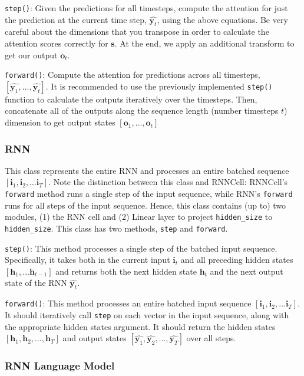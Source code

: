 \documentclass[11pt,addpoints,answers]{exam}
\newcommand{\hv}{\mathbf{h}}
\newcommand{\iv}{\mathbf{i}}
\newcommand{\ov}{\mathbf{o}}
\newcommand{\sv}{\mathbf{s}}
\newcommand{\yv}{\mathbf{y}}
\begin{document}
\texttt{step()}: Given the predictions for all timesteps, compute the attention for just the prediction at the current time step, $\hat{\yv_t}$, using the above equations. Be very careful about the dimensions that you transpose in order to calculate the attention scores correctly for $\sv$. At the end, we apply an additional transform to get our output $\ov_t$.

\texttt{forward()}: Compute the attention for predictions across all timesteps, $[\hat{\yv_1}, \ldots, \hat{\yv_t}]$. It is recommended to use the previously implemented \texttt{step()} function to calculate the outputs iteratively over the timesteps. Then, concatenate all of the outputs along the sequence length (number timesteps $t$) dimension to get output states $[\ov_1, \ldots, \ov_t]$

\subsubsection{RNN}

This class represents the entire RNN and processes an entire batched sequence $[\iv_1, \iv_2, \ldots \iv_T]$. Note the distinction between this class and RNNCell: RNNCell's \texttt{forward} method runs a single step of the input sequence, while RNN's \texttt{forward} runs for all steps of the input sequence. Hence, this class contains (up to) two modules, (1) the RNN cell and (2) Linear layer to project \texttt{hidden\_size} to \texttt{hidden\_size}. This class has two methods, \texttt{step} and \texttt{forward}.

\texttt{step()}: This method processes a single step of the batched input sequence. Specifically, it takes both in the current input $\iv_t$ and all preceding hidden states $[\hv_1, \ldots \hv_{t-1}]$ and returns both the next hidden state $\hv_t$ and the next output state of the RNN $\hat{\yv_t}$. 

\texttt{forward()}: This method processes an entire batched input sequence $[\iv_1, \iv_2, \ldots \iv_T]$. It should iteratively call \texttt{step} on each vector in the input sequence, along with the appropriate hidden states argument. It should return the hidden states $[\hv_1, \hv_2, \ldots, \hv_T]$ and output states $[\hat{\yv_1}, \hat{\yv_2}, \ldots, \hat{\yv_T}]$ over all steps.


\subsubsection{RNN Language Model}
\end{document}

